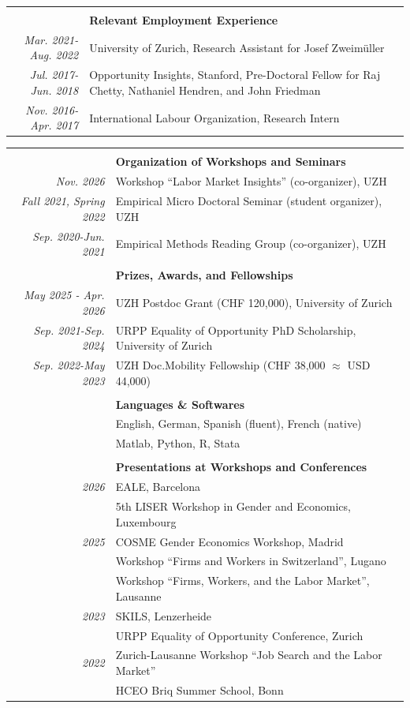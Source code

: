 \documentclass[a4,11pt,oneside]{article}
\newcommand{\headercv}[1]{ & \\[1pt] & \large \textbf{#1}   \\[1pt]	}
\begin{document}
\begin{tabular}{@{} >{\em \small}r  @{\hskip 5pt} p{12.5cm}}
\headercv{Relevant Employment Experience}	
 Mar. 2021-Aug. 2022 & University of Zurich, Research Assistant for Josef Zweim\"{u}ller \\    
  Jul. 2017-Jun. 2018   & Opportunity Insights, Stanford, Pre-Doctoral Fellow for Raj Chetty,    Nathaniel Hendren, and John Friedman \\
 Nov. 2016-Apr. 2017 & International Labour Organization, Research Intern  \\

\end{tabular} 

\noindent \begin{tabular}{@{} >{\em \small}r  @{\hskip 5pt} p{12.5cm}}
   
   \headercv{Organization of Workshops and Seminars}
Nov. 2026   & Workshop ``Labor Market Insights'' (co-organizer), UZH \\
Fall 2021, Spring 2022   & Empirical Micro Doctoral Seminar (student organizer), UZH \\
Sep. 2020-Jun. 2021   & Empirical Methods Reading Group (co-organizer), UZH \\



\headercv{Prizes, Awards, and Fellowships}	
 May 2025 - Apr. 2026	 & UZH Postdoc Grant (CHF 120,000), University of Zurich \\
 Sep. 2021-Sep. 2024	 & URPP Equality of Opportunity PhD Scholarship, University of Zurich \\
 Sep. 2022-May 2023 & UZH Doc.Mobility Fellowship (CHF 38,000 $\approx$ USD 44,000) \\

	\headercv{Languages \& Softwares}	
  & English, German, Spanish (fluent), French (native)  \\	
& Matlab, Python, R, Stata  \\

   \headercv{Presentations at Workshops and Conferences}
2026   & EALE, Barcelona \\ & 5th LISER Workshop in Gender and Economics, Luxembourg \\
2025   & COSME Gender Economics Workshop, Madrid \\ & Workshop ``Firms and Workers in Switzerland'', Lugano \\ & Workshop ``Firms, Workers, and the Labor Market'', Lausanne \\
2023   & SKILS, Lenzerheide \\ & URPP Equality of Opportunity Conference, Zurich \\
2022   & Zurich-Lausanne Workshop ``Job Search and the Labor Market'' \\ & HCEO Briq Summer School, Bonn \\
\end{tabular}
\end{document}
